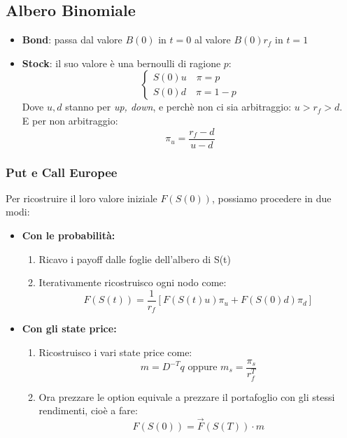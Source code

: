 \documentclass[a4paper,notitlepage]{report}%
\begin{document}
\begin{multicols*}{2}
    \subsection*{Albero Binomiale}
        \begin{itemize}
            \item \textbf{Bond}: passa dal valore $B(0)$ in $t=0$ al valore $B(0)r_f$ in $t=1$
            \item \textbf{Stock}: il suo valore è una bernoulli di ragione $p$:
                \[
                    \left\{\begin{array}{l}
                        S(0)u \quad \pi = p \\
                        S(0)d \quad \pi = 1-p
                    \end{array}\right.
                \]
                Dove $u,d$ stanno per \textit{up, down},
                e perchè non ci sia arbitraggio: $u>r_f>d$.\\
                E per non arbitraggio:
                \[
                    \pi_u = \frac{r_f - d}{u - d}
                \]
        \end{itemize}
    
        \subsubsection*{Put e Call Europee}
        Per ricostruire il loro valore iniziale $F(S(0))$,
        possiamo procedere in due modi:
        \begin{itemize}
            \item \textbf{Con le probabilità:}
                \begin{enumerate}
                    \item Ricavo i payoff dalle foglie dell'albero di S(t)
                    \item Iterativamente ricostruisco ogni nodo come:
                        \[
                            F(S(t)) = \frac{1}{r_f}[F(S(t)u)\pi_u + F(S(0)d)\pi_d]    
                        \]
                \end{enumerate}
            \item \textbf{Con gli state price:}
                \begin{enumerate}
                    \item Ricostruisco i vari state price come:
                        \[
                            m = D^{-T}q  \text{ oppure } m_s = \frac{\pi_s}{r_f^T} 
                        \]
                    \item Ora prezzare le option equivale a prezzare
                    il portafoglio con gli stessi rendimenti, cioè a fare:
                        \[
                            F(S(0)) = \vec{F}(S(T)) \cdot m
                        \]
                \end{enumerate}
        \end{itemize}
        


\end{multicols*}
\end{document}
